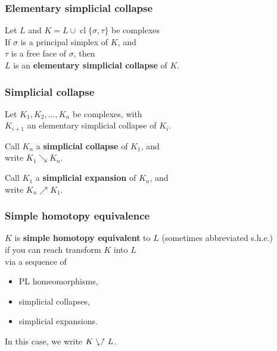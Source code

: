 \documentclass[14pt]{beamer}
\newcommand{\collapses}{\searrow}
\newcommand{\expands}{\nearrow}
\newcommand{\she}{\ssearrow\nnearrow}
\DeclareMathOperator{\cl}{cl}
\begin{document}
\begin{frame}
\frametitle{Elementary simplicial collapse}

\begin{definition}
  Let $L$ and $K = L \cup \cl \{ \sigma, \tau \}$ be complexes \\

  \vspace{1ex}If $\sigma$ is a principal simplex of $K$, and \\
  $\tau$ is a free face of $\sigma$, then \\
  $L$ is an \textbf{elementary simplicial collapse} of $K$.
\end{definition}

\end{frame}

\begin{frame}
\frametitle{Simplicial collapse}

\begin{definition}
  Let $K_1, K_2, \ldots, K_n$ be complexes, with \\
  $K_{i+1}$ an elementary simplicial collapse of $K_i$.

  \vspace{1ex}Call $K_n$ a \textbf{simplicial collapse} of $K_1$, and \\
  write $K_1 \collapses K_n$.

  \vspace{1ex}Call $K_1$ a \textbf{simplicial expansion} of $K_n$, and \\
  write $K_n \expands K_1$.
\end{definition}

\end{frame}

\begin{frame}
  \frametitle{Simple homotopy equivalence}

  \begin{definition}
    $K$ is \textbf{simple homotopy equivalent} to $L$
    \quad (sometimes abbreviated s.h.e.) \\
    if you can reach transform $K$ into $L$ \\
    via a sequence of
    \begin{itemize}
    \item PL homeomorphisms,
    \item simplicial collapses,
    \item simplicial expansions.
    \end{itemize}
    In this case, we write $K \she L$.
  \end{definition}

\end{frame}
\end{document}
